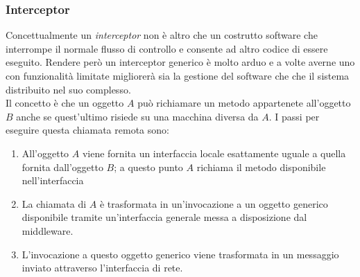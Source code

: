 \subsubsection{Interceptor}
Concettualmente un \emph{interceptor} non è altro che un costrutto software che interrompe il normale flusso di controllo e consente ad altro codice di essere eseguito. Rendere però un interceptor generico è molto arduo e a volte averne uno con funzionalità limitate migliorerà sia la gestione del software che che il sistema distribuito nel suo complesso.\\
Il concetto è che un oggetto $A$ può richiamare un metodo appartenete all'oggetto $B$ anche se quest'ultimo risiede su una macchina diversa da $A$.
I passi per eseguire questa chiamata remota sono:
\begin{enumerate}
\item All'oggetto $A$ viene fornita un interfaccia locale esattamente uguale a quella fornita dall'oggetto $B$; a questo punto $A$ richiama il metodo disponibile nell'interfaccia
\item La chiamata di $A$ è trasformata in un'invocazione a un oggetto generico disponibile tramite un'interfaccia generale messa a disposizione dal middleware.
\item L'invocazione a questo oggetto generico viene trasformata in un messaggio inviato attraverso l'interfaccia di rete.
\end{enumerate}
